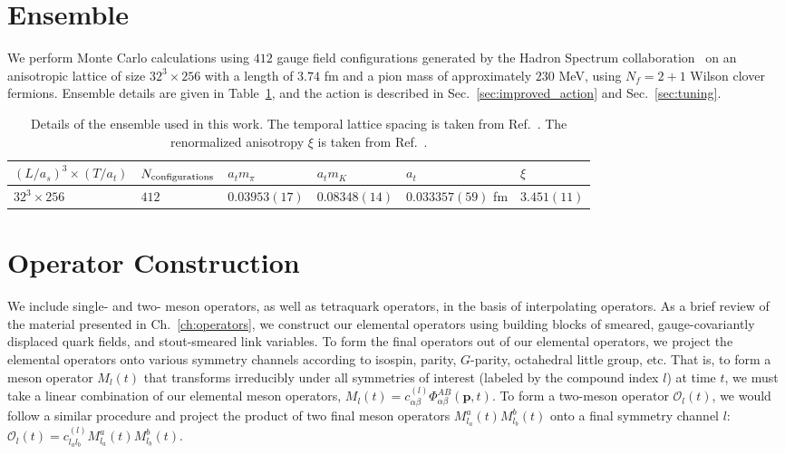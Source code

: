 \section{Ensemble}\label{sec:ensemble}
We perform Monte Carlo calculations using $412$ gauge field configurations generated by the Hadron Spectrum collaboration~\cite{Edwards:2008ja, Lin:2008pr} on an anisotropic lattice of size $32^3\times 256$ with a length of $3.74$ fm and a pion mass of approximately $230$ MeV, using $N_f=2+1$ Wilson clover fermions. Ensemble details are given in Table~\ref{table:ensemble}, and the action is described in Sec.~\ref{sec:improved_action} and Sec.~\ref{sec:tuning}.
\renewcommand{\arraystretch}{1.0}
\begin{table}
  \centering
  \begin{tabular}{|l|l|l|l|l|l|}
    \hline
    $(L/a_s)^3 \times (T/a_t)$ & $N_{\rm{configurations}}$ & $a_t m_\pi$ & $a_t m_K$ & $a_t$ & $\xi$ \\
    \hline
    $32^3\times 256$ & $412$ & $0.03953(17)$ & $0.08348(14)$ & $0.033357(59)$ fm & $3.451(11)$\\
    \hline
  \end{tabular}
  \caption[Details of the ensemble used in this work.]{Details of the ensemble used in this work. The temporal lattice spacing is taken from Ref.~\cite{Brett:2018jqw}. The renormalized anisotropy $\xi$ is taken from Ref.~\cite{Bulava:2016mks}.}\label{table:ensemble}
\end{table}
\renewcommand{\arraystretch}{1.5}
\section{Operator Construction}
We include single- and two- meson operators, as well as tetraquark operators, in the basis of interpolating operators. As a brief review of the material presented in Ch.~\ref{ch:operators}, we construct our elemental operators using building blocks of smeared, gauge-covariantly displaced quark fields, and stout-smeared link variables. To form the final operators out of our elemental operators, we project the elemental operators onto various symmetry channels according to isospin, parity, $G$-parity, octahedral little group, etc. That is, to form a meson operator $M_{l}(t)$ that transforms irreducibly under all symmetries of interest (labeled by the compound index $l$) at time $t$, we must 
take a linear combination of our elemental meson operators, $M_{l}(t)=c_{\alpha \beta}^{(l)} \Phi_{\alpha \beta}^{A B}(\boldsymbol{p}, t)$. To form a two-meson operator $\mathcal{O}_l(t)$, we would follow a similar procedure and project the product of two final meson operators $M^{a}_{l_a}(t) M^{b}_{l_b}(t)$ onto a final symmetry channel $l$: $\mathcal{O}_l(t) = c^{(l)}_{l_a l_b} M^{a}_{l_a}(t) M^{b}_{l_b}(t)$.

